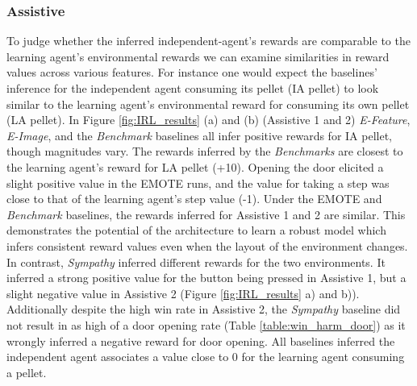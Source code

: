 \subsubsection{Assistive}
To judge whether the inferred independent-agent's rewards are comparable to the learning agent's environmental rewards we can examine similarities in reward values across various features. 
For instance one would expect the baselines' inference for the independent agent consuming its pellet (IA pellet) to look similar to the learning agent's environmental reward for consuming its own pellet (LA pellet). 
In Figure \ref{fig:IRL_results} (a) and (b) (Assistive 1 and 2) \emph{E-Feature}, \emph{E-Image}, and the \emph{Benchmark} baselines all infer positive rewards for IA pellet, though magnitudes vary. The rewards inferred by the \emph{Benchmarks} are closest to the learning agent's reward for LA pellet (+10).
Opening the door elicited a slight positive value in the EMOTE runs, and the value for taking a step was close to that of the learning agent's step value (-1). Under the EMOTE and \emph{Benchmark} baselines, the rewards inferred for Assistive 1 and 2 are similar. %
This demonstrates the potential of the architecture to learn a robust model which infers consistent reward values even when the layout of the environment changes. 
In contrast, \emph{Sympathy} inferred different rewards for the two environments. It inferred a strong positive value for the button being pressed in Assistive 1, but a slight negative value in Assistive 2 (Figure \ref{fig:IRL_results} a) and b)). Additionally despite the high win rate in Assistive 2, the \emph{Sympathy} baseline did not result in as high of a door opening rate (Table \ref{table:win_harm_door}) as it wrongly inferred a negative reward for door opening. %
 All baselines inferred the independent agent associates a value close to 0 for the learning agent consuming a pellet.

